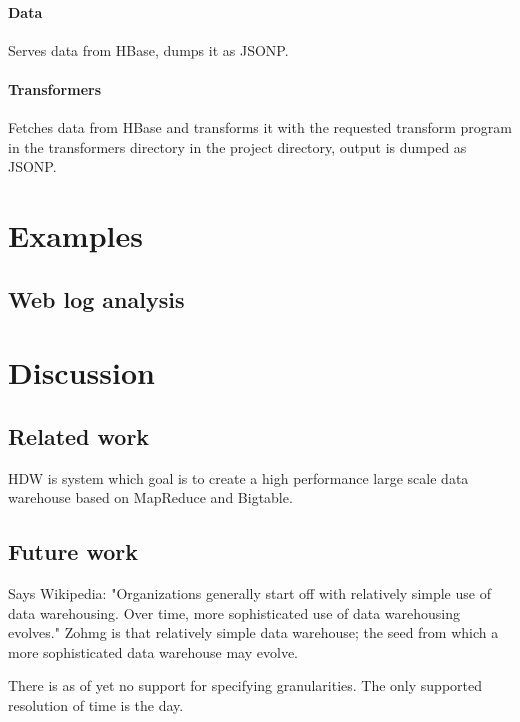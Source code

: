 \documentclass[a4paper,10pt]{book}
\begin{document}
\subsubsection{Data}

Serves data from HBase, dumps it as JSONP.


\subsubsection{Transformers}

Fetches data from HBase and transforms it with the requested transform
program in the transformers directory in the project directory, output is
dumped as JSONP.



\chapter{Examples}

\section{Web log analysis}



\chapter{Discussion}

\section{Related work}

HDW is system which goal is to create a high performance large scale data
warehouse based on MapReduce and Bigtable. \cite{hdw}



\section{Future work}

Says Wikipedia: "Organizations generally start off with relatively simple use of data warehousing. Over time, more sophisticated use of data warehousing evolves." Zohmg is that relatively simple data warehouse; the seed from which a more sophisticated data warehouse may evolve.

There is as of yet no support for specifying granularities. The only supported resolution of time is the day.
\end{document}
